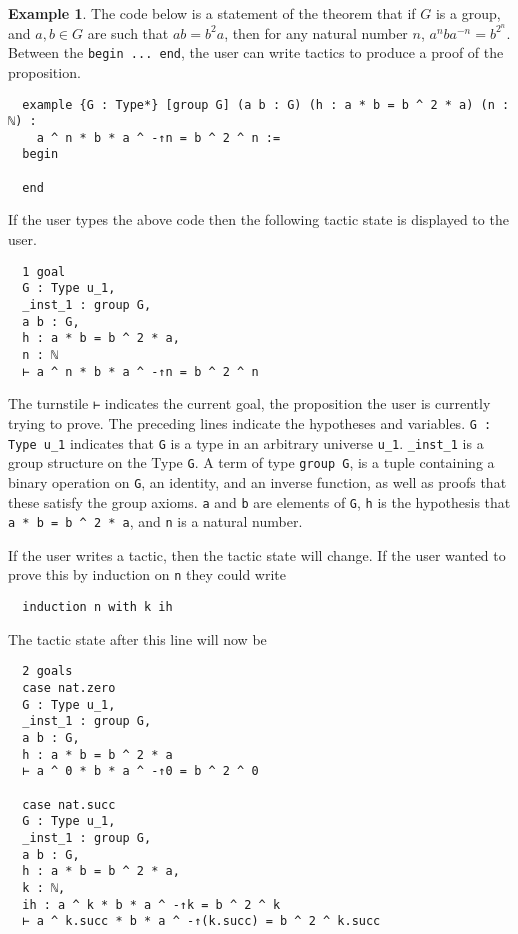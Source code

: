 \documentclass[11pt]{article} %
\theoremstyle{definition}
\theoremstyle{definition}
\theoremstyle{definition}
\theoremstyle{definition}
\theoremstyle{definition}
\theoremstyle{definition}
\newtheorem{exmpl}{Example}[theorem]
\begin{document}
\begin{exmpl}

The code below is a statement of the theorem that if $G$ is a group, and
$a, b ∈ G$ are such that $ab = b^2a$, then for any natural number $n$,
$a^nba^{-n} = b^{2^n}$. Between the \lstinline{begin ... end}, the user can
write tactics to produce a proof of the proposition.

\begin{lstlisting}
  example {G : Type*} [group G] (a b : G) (h : a * b = b ^ 2 * a) (n : ℕ) :
    a ^ n * b * a ^ -↑n = b ^ 2 ^ n :=
  begin

  end
\end{lstlisting}
If the user types the above code then the following tactic state is displayed to the user.

\begin{lstlisting}
  1 goal
  G : Type u_1,
  _inst_1 : group G,
  a b : G,
  h : a * b = b ^ 2 * a,
  n : ℕ
  ⊢ a ^ n * b * a ^ -↑n = b ^ 2 ^ n
\end{lstlisting}

The turnstile \lstinline{⊢} indicates the current goal, the proposition the user
is currently trying to prove. The preceding lines indicate the hypotheses and variables.
\lstinline{G : Type u_1} indicates that \lstinline{G} is a type in an arbitrary universe
\lstinline{u_1}. \lstinline{_inst_1} is a group structure on the Type \lstinline{G}.
A term of type \lstinline{group G}, is a tuple containing a binary operation on
\lstinline{G}, an identity, and an inverse function, as well as proofs that these
satisfy the group axioms. \lstinline{a} and \lstinline{b} are elements of
\lstinline{G}, \lstinline{h} is the hypothesis that \lstinline{a * b = b ^ 2 * a},
and \lstinline{n} is a natural number.

If the user writes a tactic, then the tactic state will change. If the user
wanted to prove this by induction on \lstinline{n} they could write

\begin{lstlisting}
  induction n with k ih
\end{lstlisting}

The tactic state after this line will now be

\begin{lstlisting}
  2 goals
  case nat.zero
  G : Type u_1,
  _inst_1 : group G,
  a b : G,
  h : a * b = b ^ 2 * a
  ⊢ a ^ 0 * b * a ^ -↑0 = b ^ 2 ^ 0

  case nat.succ
  G : Type u_1,
  _inst_1 : group G,
  a b : G,
  h : a * b = b ^ 2 * a,
  k : ℕ,
  ih : a ^ k * b * a ^ -↑k = b ^ 2 ^ k
  ⊢ a ^ k.succ * b * a ^ -↑(k.succ) = b ^ 2 ^ k.succ
\end{lstlisting}


\end{exmpl}
\end{document}
